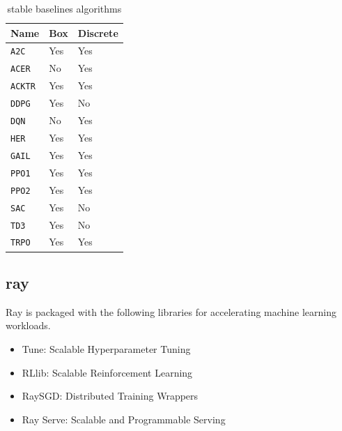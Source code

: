 \begin{table}[htbp]
\centering
\begin{tabular}{l l l} \toprule
\bfseries Name       & \bfseries Box  & \bfseries Discrete \\ \midrule
\verb#A2C#                         & Yes  &  Yes \\
\verb#ACER#                  			 & No   &  Yes \\
\verb#ACKTR#                       & Yes  &  Yes \\
\verb#DDPG#                        & Yes  &  No  \\
\verb#DQN#                         & No   &  Yes \\
\verb#HER#                         & Yes  &  Yes \\
\verb#GAIL#                        & Yes  &  Yes \\
\verb#PPO1#                        & Yes  &  Yes \\
\verb#PPO2#                        & Yes  &  Yes \\
\verb#SAC#                         & Yes  &  No  \\
\verb#TD3#                         & Yes  &  No  \\
\verb#TRPO#                        & Yes  &  Yes \\
\bottomrule
\end{tabular}
\caption{stable baselines algorithms}
\label{tab:stable-baselines}
\end{table}

\subsection{\gls{ray}}
Ray is packaged with the following libraries for accelerating machine learning workloads.
\begin{itemize}
	\item Tune: Scalable Hyperparameter Tuning
	\item RLlib: Scalable Reinforcement Learning
	\item RaySGD: Distributed Training Wrappers
	\item Ray Serve: Scalable and Programmable Serving
\end{itemize}



